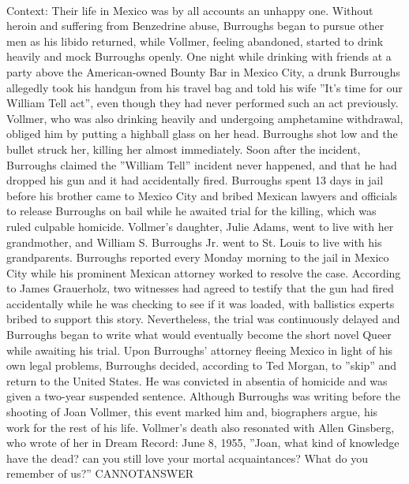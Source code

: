 \documentclass[11pt,a4paper, onecolumn]{article}
\begin{document}
\\ Context: Their life in Mexico was by all accounts an unhappy one. Without heroin and suffering from Benzedrine abuse, Burroughs began to pursue other men as his libido returned, while Vollmer, feeling abandoned, started to drink heavily and mock Burroughs openly. One night while drinking with friends at a party above the American-owned Bounty Bar in Mexico City, a drunk Burroughs allegedly took his handgun from his travel bag and told his wife ''It's time for our William Tell act'', even though they had never performed such an act previously. Vollmer, who was also drinking heavily and undergoing amphetamine withdrawal, obliged him by putting a highball glass on her head. Burroughs shot low and the bullet struck her, killing her almost immediately. Soon after the incident, Burroughs claimed the ''William Tell'' incident never happened, and that he had dropped his gun and it had accidentally fired. Burroughs spent 13 days in jail before his brother came to Mexico City and bribed Mexican lawyers and officials to release Burroughs on bail while he awaited trial for the killing, which was ruled culpable homicide. Vollmer's daughter, Julie Adams, went to live with her grandmother, and William S. Burroughs Jr. went to St. Louis to live with his grandparents. Burroughs reported every Monday morning to the jail in Mexico City while his prominent Mexican attorney worked to resolve the case. According to James Grauerholz, two witnesses had agreed to testify that the gun had fired accidentally while he was checking to see if it was loaded, with ballistics experts bribed to support this story. Nevertheless, the trial was continuously delayed and Burroughs began to write what would eventually become the short novel Queer while awaiting his trial. Upon Burroughs' attorney fleeing Mexico in light of his own legal problems, Burroughs decided, according to Ted Morgan, to ''skip'' and return to the United States. He was convicted in absentia of homicide and was given a two-year suspended sentence. Although Burroughs was writing before the shooting of Joan Vollmer, this event marked him and, biographers argue, his work for the rest of his life. Vollmer's death also resonated with Allen Ginsberg, who wrote of her in Dream Record: June 8, 1955, ''Joan, what kind of knowledge have the dead? can you still love your mortal acquaintances? What do you remember of us?'' CANNOTANSWER
\end{document}

